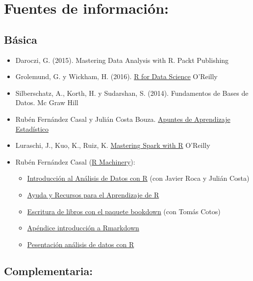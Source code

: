 \documentclass[
]{book}
\begin{document}
\hypertarget{fuentes-de-informaciuxf3n}{%
\section{Fuentes de información:}\label{fuentes-de-informaciuxf3n}}

\hypertarget{buxe1sica}{%
\subsection{Básica}\label{buxe1sica}}

\begin{itemize}
\item
  Daroczi, G. (2015). Mastering Data Analysis with R. Packt Publishing
\item
  Grolemund, G. y Wickham, H. (2016). \href{https://r4ds.had.co.nz/}{R for Data Science} O'Reilly
\item
  Silberschatz, A., Korth, H. y Sudarshan, S. (2014). Fundamentos de Bases de Datos. Mc Graw Hill
\item
  Rubén Fernández Casal y Julián Costa Bouza. \href{https://rubenfcasal.github.io/aprendizaje_estadistico/}{Apuntes de Aprendizaje Estadístico}
\item
  Luraschi, J., Kuo, K., Ruiz, K. \href{https://therinspark.com/}{Mastering Spark with R} O'Reilly
\item
  Rubén Fernández Casal (\href{https://rubenfcasal.github.io}{R Machinery}):

  \begin{itemize}
  \item
    \href{https://rubenfcasal.github.io/intror}{Introducción al Análisis de Datos con R}
    (con Javier Roca y Julián Costa)
  \item
    \href{https://rubenfcasal.github.io/post/ayuda-y-recursos-para-el-aprendizaje-de-r}{Ayuda y Recursos para el Aprendizaje de R}
  \item
    \href{https://rubenfcasal.github.io/bookdown_intro}{Escritura de libros con el paquete bookdown}
    (con Tomás Cotos)
  \item
    \href{https://rubenfcasal.github.io/bookdown_intro/rmarkdown.html}{Apéndice introducción a Rmarkdown}
  \item
    \href{https://rubenfcasal.github.io/post/presentaciones/AnalisisDatosR.pdf}{Pesentación análisis de datos con R}
  \end{itemize}
\end{itemize}

\hypertarget{complementaria}{%
\subsection{Complementaria:}\label{complementaria}}
\end{document}
